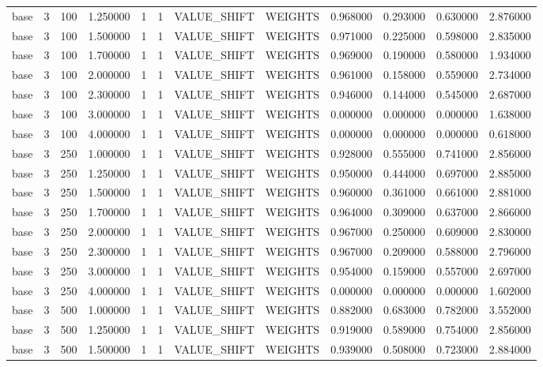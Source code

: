 \begin{tabular}{lrrrllllrrrr}
base & 3 & 100 & 1.250000 & 1 & 1 & VALUE_SHIFT & WEIGHTS & 0.968000 & 0.293000 & 0.630000 & 2.876000 \\
base & 3 & 100 & 1.500000 & 1 & 1 & VALUE_SHIFT & WEIGHTS & 0.971000 & 0.225000 & 0.598000 & 2.835000 \\
base & 3 & 100 & 1.700000 & 1 & 1 & VALUE_SHIFT & WEIGHTS & 0.969000 & 0.190000 & 0.580000 & 1.934000 \\
base & 3 & 100 & 2.000000 & 1 & 1 & VALUE_SHIFT & WEIGHTS & 0.961000 & 0.158000 & 0.559000 & 2.734000 \\
base & 3 & 100 & 2.300000 & 1 & 1 & VALUE_SHIFT & WEIGHTS & 0.946000 & 0.144000 & 0.545000 & 2.687000 \\
base & 3 & 100 & 3.000000 & 1 & 1 & VALUE_SHIFT & WEIGHTS & 0.000000 & 0.000000 & 0.000000 & 1.638000 \\
base & 3 & 100 & 4.000000 & 1 & 1 & VALUE_SHIFT & WEIGHTS & 0.000000 & 0.000000 & 0.000000 & 0.618000 \\
base & 3 & 250 & 1.000000 & 1 & 1 & VALUE_SHIFT & WEIGHTS & 0.928000 & 0.555000 & 0.741000 & 2.856000 \\
base & 3 & 250 & 1.250000 & 1 & 1 & VALUE_SHIFT & WEIGHTS & 0.950000 & 0.444000 & 0.697000 & 2.885000 \\
base & 3 & 250 & 1.500000 & 1 & 1 & VALUE_SHIFT & WEIGHTS & 0.960000 & 0.361000 & 0.661000 & 2.881000 \\
base & 3 & 250 & 1.700000 & 1 & 1 & VALUE_SHIFT & WEIGHTS & 0.964000 & 0.309000 & 0.637000 & 2.866000 \\
base & 3 & 250 & 2.000000 & 1 & 1 & VALUE_SHIFT & WEIGHTS & 0.967000 & 0.250000 & 0.609000 & 2.830000 \\
base & 3 & 250 & 2.300000 & 1 & 1 & VALUE_SHIFT & WEIGHTS & 0.967000 & 0.209000 & 0.588000 & 2.796000 \\
base & 3 & 250 & 3.000000 & 1 & 1 & VALUE_SHIFT & WEIGHTS & 0.954000 & 0.159000 & 0.557000 & 2.697000 \\
base & 3 & 250 & 4.000000 & 1 & 1 & VALUE_SHIFT & WEIGHTS & 0.000000 & 0.000000 & 0.000000 & 1.602000 \\
base & 3 & 500 & 1.000000 & 1 & 1 & VALUE_SHIFT & WEIGHTS & 0.882000 & 0.683000 & 0.782000 & 3.552000 \\
base & 3 & 500 & 1.250000 & 1 & 1 & VALUE_SHIFT & WEIGHTS & 0.919000 & 0.589000 & 0.754000 & 2.856000 \\
base & 3 & 500 & 1.500000 & 1 & 1 & VALUE_SHIFT & WEIGHTS & 0.939000 & 0.508000 & 0.723000 & 2.884000 \\

\end{tabular}
